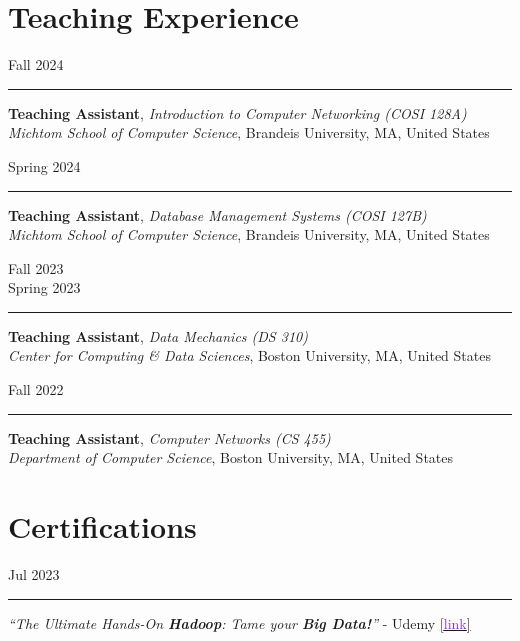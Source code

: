 \documentclass[10pt,a4paper,calibri]{moderncv}
\newcommand{\mediumspace}{\vspace{0.6em}}
\newcommand{\teachingexperience}[2]{
  \noindent
  \begin{minipage}[c]{0.12\textwidth}
    \begin{center}
      #1
    \end{center}
  \end{minipage}%
  \hspace{0.01\textwidth}
  \begin{minipage}[c]{0.02\textwidth}
    \textcolor{lightgray}{\rule{1pt}{0.7cm}}
  \end{minipage}%
  \begin{minipage}[c]{0.86\textwidth}
    \raggedright{
      \vspace{0.001cm}
      #2
      \vspace{0.001cm}
    }
  \end{minipage}%
}
\newcommand{\certificate}[2]{
  \noindent
  \begin{minipage}[c]{0.10\textwidth}
    \hfill
    #1
  \end{minipage}%
  \hspace{0.01\textwidth}
  \begin{minipage}[c]{0.02\textwidth}
    \textcolor{lightgray}{\rule{1pt}{0.4cm}}
  \end{minipage}%
  \begin{minipage}[c]{0.86\textwidth}
    \raggedright{
      #2
    }
  \end{minipage}%
}
\begin{document}


\section{Teaching Experience}
\teachingexperience{\hfill Fall 2024}{
	\textbf{Teaching Assistant}, \textit{Introduction to Computer Networking (COSI 128A)}\\
	\textit{Michtom School of Computer Science}, Brandeis University, MA, United States\\
}

\mediumspace

\teachingexperience{\hfill Spring 2024}{
	\textbf{Teaching Assistant}, \textit{Database Management Systems (COSI 127B)}\\
	\textit{Michtom School of Computer Science}, Brandeis University, MA, United States\\
}

\mediumspace

\teachingexperience{\hfill Fall 2023\\ \hfill Spring 2023}{
	\textbf{Teaching Assistant}, \textit{Data Mechanics (DS 310)}\\
	\textit{Center for Computing \& Data Sciences}, Boston University, MA, United States\\
}

\mediumspace

\teachingexperience{\hfill Fall 2022}{
	\textbf{Teaching Assistant}, \textit{Computer Networks (CS 455)}\\
	\textit{Department of Computer Science}, Boston University, MA, United States\\
}


\section{Certifications}

\certificate{Jul 2023}{
	\textit{``The Ultimate Hands-On \textbf{Hadoop}: Tame your \textbf{Big Data!}''} \-- Udemy
	\href{https://ude.my/UC-5946a326-519d-4821-8901-aa214407757c}{[\textcolor{blueviolet}{link}]}
}
\end{document}
